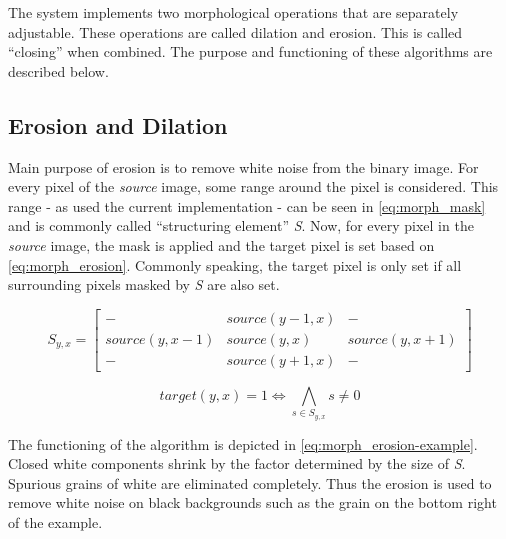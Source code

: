 \documentclass{report}
\begin{document}
The system implements two morphological operations that are separately
adjustable. These operations are called dilation and erosion. This is
called ``closing'' when combined. The purpose and functioning of these
algorithms are described below.


\subsection{Erosion and Dilation}

Main purpose of erosion is to remove white noise from the binary
image. For every pixel of the \textit{source} image, some range around
the pixel is considered. This range - as used the current
implementation - can be seen in \ref{eq:morph_mask} and is commonly
called ``structuring element'' \textit{S}. Now, for every pixel in the
\textit{source} image, the mask is applied and the target pixel is set
based on \ref{eq:morph_erosion}. Commonly speaking, the target pixel
is only set if all surrounding pixels masked by \textit{S} are also
set.

\begin{equation}\label{eq:morph_mask}
  S_{y, x} = \begin{bmatrix}

    -              & source(y-1, x) & -              \\
    source(y, x-1) & source(y, x)   & source(y, x+1) \\
    -              & source(y+1, x) & -

  \end{bmatrix}
\end{equation}

\begin{equation}\label{eq:morph_erosion}
  target(y, x) = 1 \iff \bigwedge_{s \in S_{y, x}} s \neq 0
\end{equation}

The functioning of the algorithm is depicted in
\ref{eq:morph_erosion-example}. Closed white components shrink by the
factor determined by the size of \textit{S}. Spurious grains of white
are eliminated completely. Thus the erosion is used to remove white
noise on black backgrounds such as the grain on the bottom right of
the example.
\end{document}
